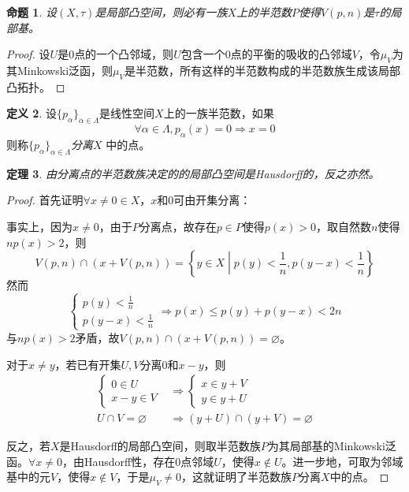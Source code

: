 \documentclass[winfonts,UTF8,c5size,a4paper,fancyhdr,hyperref,titlepage,nocap]{ctexart}
\theoremstyle{question}
\theoremstyle{theorem}
\newtheorem{thm}{定理}
\newtheorem{prop}[thm]{命题}
\theoremstyle{definition}
\newtheorem{defn}[thm]{定义}
\theoremstyle{remark}
\numberwithin{equation}{subsection}
\newcommand{\red}{\color{red}}
\begin{document}
\begin{prop}
  设$(X,\tau)$是局部凸空间，则必有一族$X$上的半范数$P$使得$V(p,n)$是$\tau$的局部基。
\end{prop}
\begin{proof}
  设$U$是$0$点的一个凸邻域，则$U$包含一个$0$点的平衡的吸收的凸邻域$V$，令$\mu_V$为其Minkowski泛函，则$\mu_V$是半范数，所有这样的半范数构成的半范数族生成该局部凸拓扑。
\end{proof}

\begin{defn}
  设$\{p_{\alpha}\}_{\alpha\in\Lambda}$是线性空间$X$上的一族半范数，如果
  \begin{equation*}
  \forall\alpha\in\Lambda, p_{\alpha}(x)=0\Longrightarrow x=0
  \end{equation*}
  则称$\{p_{\alpha}\}_{\alpha\in\Lambda}$\emph{\red 分离}$X$ 中的点。
\end{defn}

\begin{thm}
  由分离点的半范数族决定的的局部凸空间是Hausdorff的，反之亦然。
\end{thm}
\begin{proof}
  首先证明$\forall x\neq0\in X$，$x$和$0$可由开集分离：

  事实上，因为$x\neq0$，由于$P$分离点，故存在$p\in P$使得$p(x)>0$，取自然数$n$使得$np(x)>2$，则
  \begin{equation*}
  V(p,n)\cap(x+V(p,n))=\left\{y\in X\middle| p(y)<\frac{1}{n}, p(y-x)<\frac{1}{n}\right\}
  \end{equation*}
  然而
\begin{equation*}
    \begin{cases}
    p(y)<\frac{1}{n}\\
    p(y-x)<\frac{1}{n}
    \end{cases}
    \Longrightarrow
    p(x)\leqslant p(y)+p(y-x)<2n
\end{equation*}
  与$np(x)>2$矛盾，故$V(p,n)\cap(x+V(p,n))=\varnothing$。

  对于$x\neq y$，若已有开集$U,V$分离$0$和$x-y$，则
  \begin{align*}
  \begin{cases}
  0\in U\\
  x-y\in V
  \end{cases}
  &\Longrightarrow
  \begin{cases}
  x\in y+V\\
  y\in y+U
  \end{cases}\\
  U\cap V=\varnothing&\Longrightarrow(y+U)\cap(y+V)=\varnothing
  \end{align*}

  反之，若$X$是Hausdorff的局部凸空间，则取半范数族$P$为其局部基的Minkowski泛函。$\forall x\neq0$，由Hausdorff性，存在$0$点邻域$U$，使得$x\notin U$。进一步地，可取为邻域基中的元$V$，使得$x\notin V$，于是$\mu_V\neq 0$，这就证明了半范数族$P$分离$X$中的点。
\end{proof}
\end{document}
